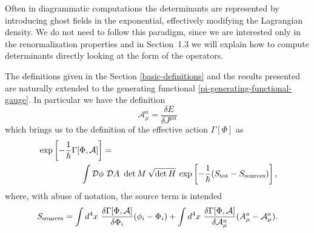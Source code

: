 Often in diagrammatic computations the determinants are represented by introducing ghost fields in the exponential, effectively modifying the Lagrangian density. We do not need to follow this paradigm, since we are interested only in the renormalization  properties and in Section~1.3 we will explain how to compute determinants directly looking at the form of the operators.

The definitions given in the Section \ref{basic-definitions} and the results presented are naturally extended to the generating functional \eqref{pi-generating-functional-gauge}.
In particular we have the definition
\begin{equation}
\mathcal{A}_\mu^a
	=
\frac{\delta E }{\delta J^{\mu a}}
\end{equation}
which brings us to the definition of the effective action $\Gamma[\Phi]$ as 
\begin{equation}\label{eff-act-gauge}
\begin{split}
&\exp\left[{- \frac{1}{\hbar}\Gamma[\Phi,\mathcal{A}]}\right] =
\\
& \hspace{5em}
\int \mathcal{D}\phi\    \mathcal{D}A\  \det M \: \sqrt{\det H} \:  
\exp \left[ -\frac{1}{\hbar}( S_{ \text{tot} } - { S_\text{sources} } ) \right],
\end{split}
\end{equation}
where, with abuse of notation, the source term is intended
\[
{ S_\text{sources} } = \int d^4x\   \frac{\delta \Gamma [\Phi, \mathcal{A}]}{ \delta \Phi_i}  (\phi_i - \Phi_i) + \int d^4x\   \frac{\delta \Gamma [\Phi, \mathcal{A}]}{ \delta \mathcal{A}^a_\mu }  (A^a_\mu - \mathcal{A}^a_\mu).
\]



